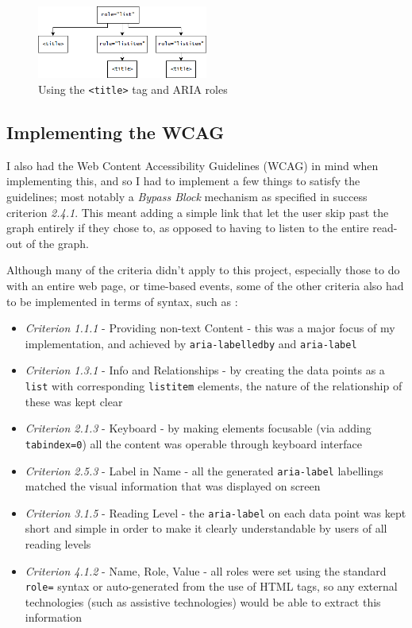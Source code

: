 \documentclass[ %
                    author={Aleena Baig},
                supervisor={Dr Simon Lock},
                    degree={BSc},
                     title={On Making Web Accessible Graphs},
                  subtitle={},
                      year={2019} ]{dissertation}
\begin{document}
\begin{figure}[h]
\centering
\includegraphics[width=0.5\textwidth]{images/listitemnesting.png}
\caption{Using the \texttt{<title>} tag and ARIA roles}
\end{figure}

\subsection{Implementing the WCAG}

I also had the Web Content Accessibility Guidelines (WCAG) in mind when implementing this, and so I had to implement a few things to satisfy the guidelines; most notably a \textit{Bypass Block} mechanism as specified in success criterion \textit{2.4.1}. This meant adding a simple link that let the user skip past the graph entirely if they chose to, as opposed to having to listen to the entire read-out of the graph.

Although many of the criteria didn't apply to this project, especially those to do with an entire web page, or time-based events, some of the other criteria also had to be implemented in terms of syntax, such as :

\begin{itemize}
    \item \textit{Criterion 1.1.1} - Providing non-text Content - this was a major focus of my implementation, and achieved by \texttt{aria-labelledby} and \texttt{aria-label}
    \item \textit{Criterion 1.3.1} - Info and Relationships - by creating the data points as a \texttt{list} with corresponding \texttt{listitem} elements, the nature of the relationship of these was kept clear
    \item \textit{Criterion 2.1.3} - Keyboard - by making elements focusable (via adding \texttt{tabindex=0}) all the content was operable through keyboard interface
    \item \textit{Criterion 2.5.3} - Label in Name - all the generated \texttt{aria-label} labellings matched the visual information that was displayed on screen
    \item \textit{Criterion 3.1.5} - Reading Level - the \texttt{aria-label} on each data point was kept short and simple in order to make it clearly understandable by users of all reading levels
    \item \textit{Criterion 4.1.2} - Name, Role, Value - all roles were set using the standard \texttt{role=} syntax or auto-generated from the use of HTML tags, so any external technologies (such as assistive technologies) would be able to extract this information
\end{itemize}
\end{document}

